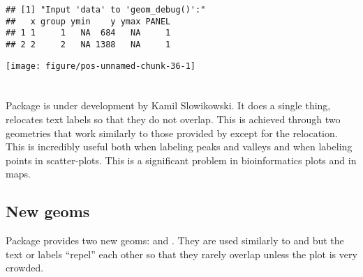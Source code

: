 \documentclass[paper=a4,10pt,div=17,headsepline,BCOR=12mm,twoside,open=right]{scrbook}\usepackage{knitr}
\begin{document}
\begin{knitrout}\footnotesize
{}\color{fgcolor}\begin{kframe}
\begin{alltt}
  \hlopt{+}
  \hlstd{()} \hlopt{+}
  \hlstd{(} 
                \hlstd{=} \hlstd{,}    \hlstd{=} \hlstd{())}
\end{alltt}
\begin{verbatim}
## [1] "Input 'data' to 'geom_debug()':"
##   x group ymin    y ymax PANEL
## 1 1     1   NA  684   NA     1
## 2 2     2   NA 1388   NA     1
\end{verbatim}
\end{kframe}

{\centering \texttt{[image: figure/pos-unnamed-chunk-36-1]} 

}



\end{knitrout}

\section[ggrepel]{\ggrepel}

Package \ggrepel is under development by Kamil Slowikowski. It does a single
thing, relocates text labels so that they do not overlap. This is achieved through
two geometries that work similarly to those provided by \ggplot except for the
relocation. This is incredibly useful both when labeling peaks and valleys and when
labeling points in scatter-plots. This is a significant problem in bioinformatics
plots and in maps.

\subsection{New geoms}

Package \ggrepel provides two new geoms:  and . They are used similarly to  and  but the text or labels ``repel'' each other so that they rarely overlap unless the plot is very crowded.
\end{document}
